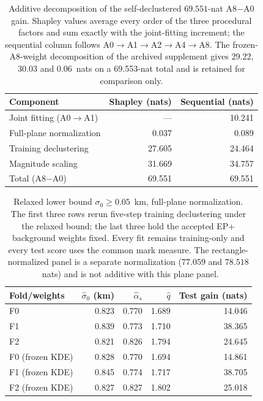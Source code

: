 \begin{table}[htbp]\centering\small
\begin{tabular}{@{}lrr@{}}\toprule
Component & Shapley (nats) & Sequential (nats)\\\midrule
Joint fitting (A0$\to$A1) & --- & 10.241 \\
Full-plane normalization & 0.037 & 0.089 \\
Training declustering & 27.605 & 24.464 \\
Magnitude scaling & 31.669 & 34.757 \\
Total (A8$-$A0) & 69.551 & 69.551 \\
\bottomrule\end{tabular}
\caption{Additive decomposition of the self-declustered $69.551$-nat A8$-$A0 gain. Shapley values average every order of the three procedural factors and sum exactly with the joint-fitting increment; the sequential column follows A0$\to$A1$\to$A2$\to$A4$\to$A8. The frozen-A8-weight decomposition of the archived supplement gives 29.22, 30.03 and 0.06~nats on a 69.553-nat total and is retained for comparison only.}
\label{tab:epplus-factorial}
\end{table}

\begin{table}[htbp]\centering\small
\begin{tabular}{@{}lrrrr@{}}\toprule
Fold/weights & $\widehat\sigma_0$ (km) & $\widehat\alpha_s$ & $\widehat q$ & Test gain (nats)\\\midrule
F0 & 0.823 & 0.770 & 1.689 & 14.046 \\
F1 & 0.839 & 0.773 & 1.710 & 38.365 \\
F2 & 0.821 & 0.826 & 1.794 & 24.645 \\
F0 (frozen KDE) & 0.828 & 0.770 & 1.694 & 14.861 \\
F1 (frozen KDE) & 0.845 & 0.774 & 1.717 & 38.705 \\
F2 (frozen KDE) & 0.827 & 0.827 & 1.802 & 25.018 \\
\bottomrule\end{tabular}
\caption{Relaxed lower bound $\sigma_0\geq0.05$~km, full-plane normalization. The first three rows rerun five-step training declustering under the relaxed bound; the last three hold the accepted EP+ background weights fixed. Every fit remains training-only and every test score uses the common mark measure. The rectangle-normalized panel is a separate normalization ($77.059$ and $78.518$~nats) and is not additive with this plane panel.}
\label{tab:sigma0-relaxation}
\end{table}

